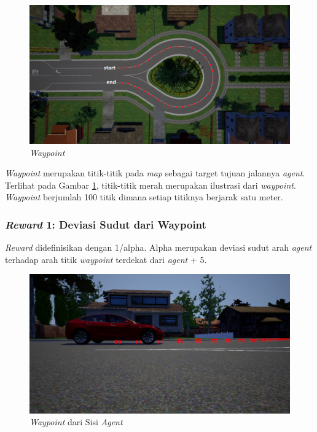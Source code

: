 \begin{figure}[H] 
	\centering
	\includegraphics[width=1\linewidth]{images/waypoint}
	\caption{\textit{Waypoint}}
	\label{fig:waypoint}
\end{figure}

\textit{Waypoint} merupakan titik-titik pada \textit{map} sebagai target tujuan jalannya \textit{agent}. Terlihat pada Gambar \ref{fig:waypoint}, titik-titik merah merupakan ilustrasi dari \textit{waypoint}. \textit{Waypoint} berjumlah 100 titik dimana setiap titiknya berjarak satu meter.

\subsubsection{\textit{Reward} 1: Deviasi Sudut dari Waypoint}
\textit{Reward} didefinisikan dengan 1/alpha. Alpha merupakan deviasi sudut arah \textit{agent }terhadap arah titik \textit{waypoint} terdekat dari \textit{agent} + 5.

\begin{figure}[H] 
	\centering
	\includegraphics[width=1\linewidth]{images/waypoint_fromside}
	\caption{\textit{Waypoint }dari Sisi \textit{Agent}}
	\label{fig:waypoint_fromside}
\end{figure}


